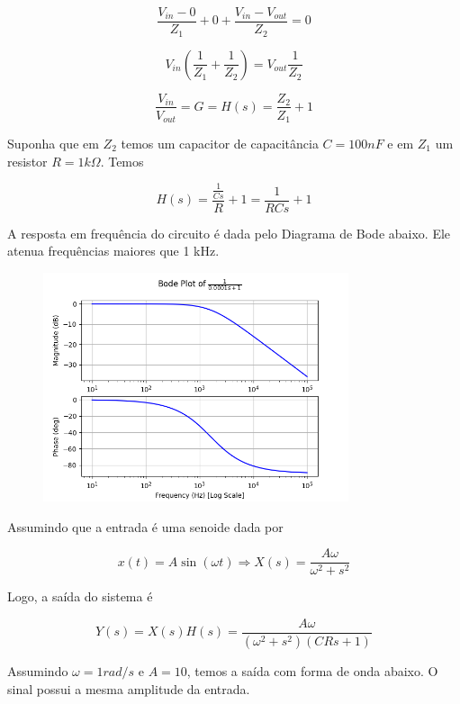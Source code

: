 \documentclass[12pt]{scrartcl}
\begin{document}
\[ \frac{V_{in} - 0}{Z_1} + 0 + \frac{V_{in} - V_{out}}{Z_2} = 0  \]

\[ V_{in} \left(\frac{1}{Z_1} + \frac{1}{Z_2}\right) = V_{out} \frac{1}{Z_2}  \]

\[ \frac{V_{in}}{V_{out}} = G = H(s) = \frac{Z_2}{Z_1} + 1  \]

Suponha que em $Z_2$ temos um capacitor de capacitância $C = 100 nF$ e em $Z_1$
um resistor $R = 1 k\Omega$. Temos

\[ H(s) = \frac{\frac{1}{Cs}}{R} + 1 = \frac{1}{RCs} + 1 \]

A resposta em frequência do circuito é dada pelo Diagrama de Bode abaixo.
Ele atenua frequências maiores que 1 kHz.

\begin{figure}[h!]
	\begin{center}
    \includegraphics[width=0.8\textwidth,trim=1 1 1 1,clip]{ex2_bode.png}
	\end{center}
\end{figure}


Assumindo que a entrada é uma senoide dada por

\[ x(t) = A \sin (\omega t) \Longrightarrow X(s) = \frac{A \omega}{\omega^{2} + s^{2}} \]

Logo, a saída do sistema é  

\[ Y(s) = X(s) H(s) =  \frac{A \omega}{\left(\omega^{2} + s^{2}\right) \left(C R s + 1\right)} \]

Assumindo $\omega = 1 rad / s$ e $A = 10$, temos a saída com forma de onda abaixo.
O sinal possui a mesma amplitude da entrada.
\end{document}
